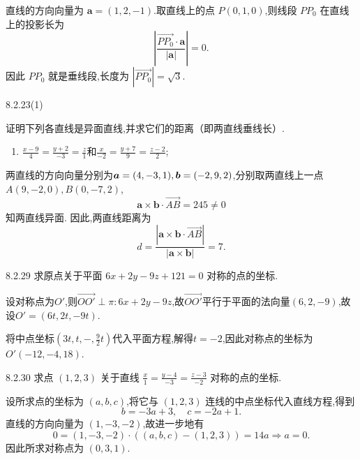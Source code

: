 \begin{solution}
    直线的方向向量为 $\bm{a} = (1, 2, -1)$.取直线上的点 $P(0, 1, 0)$,则线段 $PP_0$ 在直线上的投影长为
\[
\left|\frac{\overrightarrow{PP_0} \cdot \bm{a}}{|\bm{a}|}\right| = 0.
\]
因此 $PP_0$ 就是垂线段,长度为 $\left| \overrightarrow{PP_0} \right| = \sqrt{3}$.
\end{solution}

\begin{exercise}{8.2.23(1)}
    
\end{exercise}

\begin{exercise}
证明下列各直线是异面直线,并求它们的距离（即两直线垂线长）.

\begin{enumerate}
    \item $\frac{x - 9}{4} = \frac{y + 2}{-3} = \frac{z}{1}$和$\frac{x}{-2} = \frac{y+7}{9} = \frac{z-2}{2}$;
\end{enumerate}
    \end{exercise}
    
    \begin{solution}
    两直线的方向向量分别为$\bm{a} = (4,-3,1), \bm{b} = (-2,9,2)$,分别取两直线上一点$A(9, -2, 0), B(0, -7, 2)$,
    \[
    \bm{a} \times \bm{b} \cdot \overrightarrow{AB} = 245 \neq 0
    \]
    知两直线异面.
    因此,两直线距离为
    \[
    d = \frac{|\bm{a} \times \bm{b} \cdot \overrightarrow{AB}|}{|\bm{a} \times \bm{b}|} = 7.
    \]
    \end{solution}

\begin{exercise}{8.2.29}
求原点关于平面 $6x + 2y - 9z + 121 = 0$ 对称的点的坐标.
\end{exercise}

\begin{solution}
    设对称点为$O'$,则$\overrightarrow{OO'} \perp \pi:6x+2y-9z$,故$\overrightarrow{OO'}$平行于平面的法向量$(6,2,-9)$,故设$O' = (6t,2t,-9t)$.

    将中点坐标$(3t,t,-,\frac92 t)$代入平面方程,解得$t = -2$,因此对称点的坐标为$O'(-12,-4,18)$.
\end{solution}

\begin{exercise}{8.2.30}
求点 $(1, 2, 3)$ 关于直线 $\frac{x}{1} = \frac{y - 4}{-3} = \frac{z - 3}{-2}$ 对称的点的坐标.
\end{exercise}

\begin{solution}
    设所求点的坐标为 $(a, b, c)$,将它与 $(1, 2, 3)$ 连线的中点坐标代入直线方程,得到
\[
b = -3a + 3, \quad c = -2a + 1.
\]
直线的方向向量为 $(1, -3, -2)$,故进一步地有
\[
0 = (1, -3, -2) \cdot \left( (a, b, c) - (1, 2, 3) \right) = 14a \Rightarrow a = 0.
\]
因此所求对称点为 $(0, 3, 1)$.
\end{solution}
    





